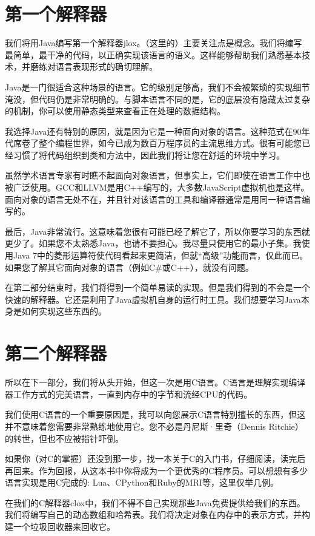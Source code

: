 \documentclass[cn,11pt,chinese]{elegantbook}
\begin{document}
\section{第一个解释器}

我们将用Java编写第一个解释器jlox。（这里的）主要关注点是概念。我们将编写最简单，最干净的代码，以正确实现该语言的语义。这样能够帮助我们熟悉基本技术，并磨练对语言表现形式的确切理解。

Java是一门很适合这种场景的语言。它的级别足够高，我们不会被繁琐的实现细节淹没，但代码仍是非常明确的。与脚本语言不同的是，它的底层没有隐藏太过复杂的机制，你可以使用静态类型来查看正在处理的数据结构。

我选择Java还有特别的原因，就是因为它是一种面向对象的语言。这种范式在90年代席卷了整个编程世界，如今已成为数百万程序员的主流思维方式。很有可能您已经习惯了将代码组织到类和方法中，因此我们将让您在舒适的环境中学习。

虽然学术语言专家有时瞧不起面向对象语言，但事实上，它们即使在语言工作中也被广泛使用。GCC和LLVM是用C++编写的，大多数JavaScript虚拟机也是这样。面向对象的语言无处不在，并且针对该语言的工具和编译器通常是用同一种语言编写的。

最后，Java非常流行。这意味着您很有可能已经了解它了，所以你要学习的东西就更少了。如果您不太熟悉Java，也请不要担心。我尽量只使用它的最小子集。我使用Java 7中的菱形运算符使代码看起来更简洁，但就“高级”功能而言，仅此而已。如果您了解其它面向对象的语言（例如C\#或C++），就没有问题。

在第二部分结束时，我们将得到一个简单易读的实现。但是我们得到的不会是一个快速的解释器。它还是利用了Java虚拟机自身的运行时工具。我们想要学习Java本身是如何实现这些东西的。

\section{第二个解释器}

所以在下一部分，我们将从头开始，但这一次是用C语言。C语言是理解实现编译器工作方式的完美语言，一直到内存中的字节和流经CPU的代码。

我们使用C语言的一个重要原因是，我可以向您展示C语言特别擅长的东西，但这并不意味着您需要非常熟练地使用它。您不必是丹尼斯·里奇（Dennis Ritchie）的转世，但也不应被指针吓倒。

如果你（对C的掌握）还没到那一步，找一本关于C的入门书，仔细阅读，读完后再回来。作为回报，从这本书中你将成为一个更优秀的C程序员。可以想想有多少语言实现是用C完成的: Lua、CPython和Ruby的MRI等，这里仅举几例。

在我们的C解释器clox中，我们不得不自己实现那些Java免费提供给我们的东西。我们将编写自己的动态数组和哈希表。我们将决定对象在内存中的表示方式，并构建一个垃圾回收器来回收它。
\end{document}
